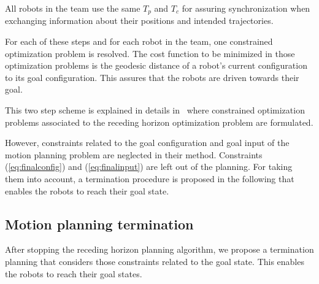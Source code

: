 \documentclass[eprint]{actapoly}
\begin{document}
\mbox{}

All robots in the team use the same $T_p$ and $T_c$ for assuring synchronization when exchanging information about their positions and intended trajectories.

For each of these steps and for each robot in the team, one constrained optimization problem is resolved. The cost function to be minimized in those
optimization problems
is the geodesic distance of a robot's current configuration to its goal configuration.
This assures that the robots are driven towards their goal.

This two step scheme is explained in details in~\cite{Defoort2009, Defoort2007a} where 
constrained optimization problems associated to the receding horizon 
optimization problem are formulated.

However, constraints related to the goal configuration and goal input of the motion planning problem are
neglected in their method.
Constraints (\ref{eq:finalconfig}) and (\ref{eq:finalinput}) are left out of the planning.
For taking them into account, a termination procedure is proposed in the following that enables the robots to reach their goal state.



\subsection{Motion planning termination}





After stopping the receding horizon planning algorithm, we propose a 
termination planning that considers those constraints related to
the goal state.
This enables the robots to reach their goal states.

\end{document}
